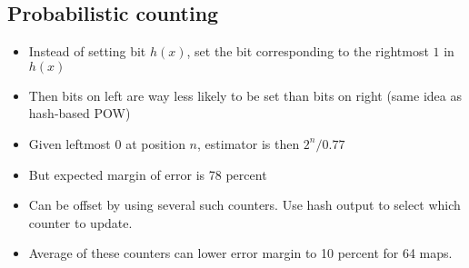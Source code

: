 \documentclass[a4paper]{scrreprt}
\begin{document}
\subsection{Probabilistic counting}

\begin{itemize}
		\item Instead of setting bit $h(x)$, set the bit corresponding to the rightmost $1$ in $h(x)$
		\item Then bits on left are way less likely to be set than bits on right (same idea as hash-based POW)
		\item Given leftmost $0$ at position $n$, estimator is then $2^n/0.77$
		\item But expected margin of error is 78 percent
		\item Can be offset by using several such counters. Use hash output to select which counter to update.
		\item Average of these counters can lower error margin to 10 percent for 64 maps.
\end{itemize}



\printbibliography
\end{document}
